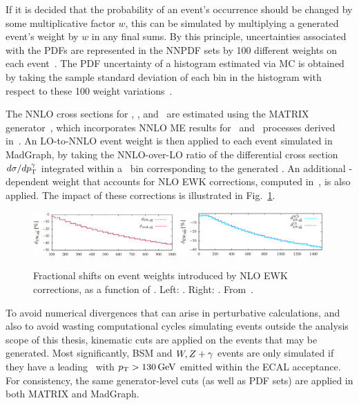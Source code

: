 \documentclass[oneside, letterpaper, 12pt, oldfontcommands]{memoir}
\begin{document}
If it is decided that the probability of an event's occurrence should be changed by some multiplicative factor $w$, this can be simulated
by multiplying a generated event's weight by $w$ in any final sums. By this principle, uncertainties associated with the PDFs are
represented in the NNPDF sets by 100 different weights on each event~\cite{ref:NNPDF30,ref:NNPDF31}. The PDF uncertainty of a histogram
estimated via MC is obtained by taking the sample standard deviation of each bin in the histogram with respect to these 100 weight variations~\cite{ref:0954-3899/43/2/023001}.

The NNLO cross sections for \zinvg, \wlng, and \zllg\ are estimated using the MATRIX generator~\cite{ref:epjc/s10052-018-5771-7},
which incorporates NNLO ME results for \PZ\Pgamma\ and \PW\Pgamma\ processes derived in~\cite{ref:j.physletb.2014.02.037, ref:JHEP07(2015)085, ref:JHEP12(2015)047}.
An LO-to-NNLO event weight is then applied to each event simulated in MadGraph, by taking the NNLO-over-LO ratio of the differential cross section $d\sigma/d\pTgamma$
integrated within a \pTgamma\ bin corresponding to the generated \Pgamma.
An additional \pTgamma-dependent weight that accounts for NLO EWK corrections, computed in~\cite{ref:JHEP04(2015)018, ref:JHEP02(2016)057}, is also applied.
The impact of these corrections is illustrated in Fig.~\ref{fig:NLO_EWK_weights}.

\begin{figure}[hbtp]
  \begin{center}
    \includegraphics[width=0.49\textwidth]{Figures/Zg_NLO_weights.png}
    \includegraphics[width=0.49\textwidth]{Figures/Wg_NLO_weights.png}
    \caption{
    Fractional shifts on event weights introduced by NLO EWK corrections, as a function of \pTgamma. Left: \zinvg. Right: \wlng. From~\cite{ref:JHEP04(2015)018, ref:JHEP02(2016)057}.
    }
    \label{fig:NLO_EWK_weights}
  \end{center}
\end{figure}

To avoid numerical divergences that can arise in perturbative calculations, and also to avoid wasting computational cycles simulating events outside the analysis scope of this
thesis, kinematic cuts are applied on the events that may be generated. Most significantly, BSM and $\PW,\PZ + \Pgamma$ events are only simulated if they have a leading
\Pgamma\ with $\pT > 130\unit{GeV}$ emitted within the ECAL acceptance. For consistency, the same generator-level cuts (as well as PDF sets) are applied in both MATRIX and MadGraph.
\end{document}
